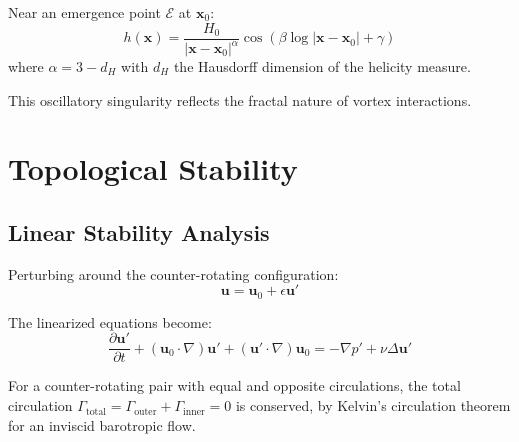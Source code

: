\begin{proposition}\label{prop:helicity-sing}
Near an emergence point $\mathcal{E}$ at $\mathbf{x}_0$:
\begin{equation}
h(\mathbf{x}) = \frac{H_0}{|\mathbf{x} - \mathbf{x}_0|^\alpha} \cos(\beta \log|\mathbf{x} - \mathbf{x}_0| + \gamma)
\end{equation}
where $\alpha = 3 - d_H$ with $d_H$ the Hausdorff dimension of the helicity measure.
\end{proposition}

This oscillatory singularity reflects the fractal nature of vortex interactions\cite{ricca1992}.

\section{Topological Stability}

\subsection{Linear Stability Analysis}

Perturbing around the counter-rotating configuration:
\begin{equation}
\mathbf{u} = \mathbf{u}_0 + \epsilon \mathbf{u}'
\end{equation}

The linearized equations become:
\begin{equation}
\frac{\partial \mathbf{u}'}{\partial t} + (\mathbf{u}_0 \cdot \nabla)\mathbf{u}' + (\mathbf{u}' \cdot \nabla)\mathbf{u}_0 = -\nabla p' + \nu \Delta \mathbf{u}'
\end{equation}

\begin{theorem}\label{thm:topological-stability}
For a counter-rotating pair with equal and opposite circulations, the total
circulation $\Gamma_{\text{total}} = \Gamma_{\text{outer}} + \Gamma_{\text{inner}} = 0$
is conserved, by Kelvin's circulation theorem for an inviscid barotropic flow.
\end{theorem}

